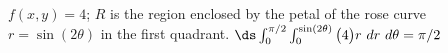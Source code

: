 {$f(x,y) = 4$; $R$ is the region enclosed by the petal of the rose curve $r=\sin(2\theta)$ in the first quadrant.
}
{$\ds \int_0^{\pi/2}\int_{0}^{\sin(2\theta)} \big(4\big)r\ dr\ d\theta = \pi/2$
}